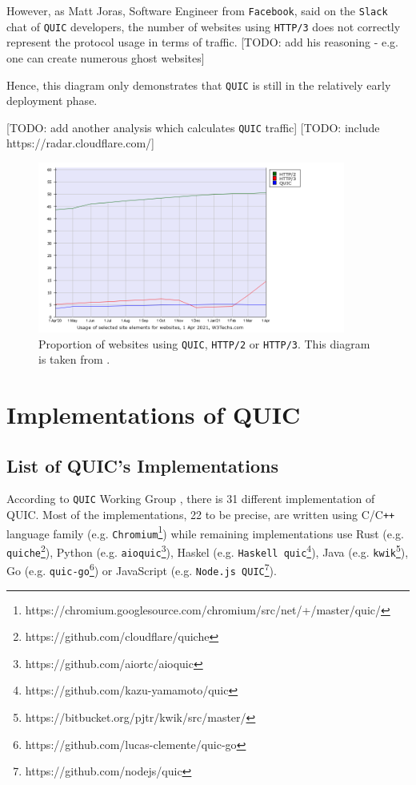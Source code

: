 \documentclass[12pt,a4paper,twoside,openright]{report}
\begin{document}
However, as Matt Joras, Software Engineer from \texttt{Facebook}, said on the \texttt{Slack} chat of \texttt{QUIC} developers, the number of websites using \texttt{HTTP/3} does not correctly represent the protocol usage in terms of traffic. 
[TODO: add his reasoning - e.g. one can create numerous ghost websites]

Hence, this diagram only demonstrates that \texttt{QUIC} is still in the relatively early deployment phase.

[TODO: add another analysis which calculates \texttt{QUIC} traffic]
[TODO: include https://radar.cloudflare.com/]


    \begin{figure}[ht]
    \centering
    \includegraphics[width=0.9\textwidth]{figs/Adoption_comparison_Between_http2_http3_quic.png}
    \caption{Proportion of websites using \texttt{QUIC}, \texttt{HTTP/2} or \texttt{HTTP/3}. This diagram is taken from \cite{bib_Adoption_comparison_Between_http2_http3_quic}.}
    \label{fig:Adoption_comparison_Between_http2_http3_quic}
    \end{figure}









\section{Implementations of QUIC}

\subsection{List of QUIC's Implementations} \label{List_of_QUIC_implementations}
According to \texttt{QUIC} Working Group \cite{number_of_QUIC_implementations}, there is 31 different implementation of QUIC. Most of the implementations, 22 to be precise, are written using C/C\texttt{++} language family (e.g. \texttt{Chromium}\footnote{https://chromium.googlesource.com/chromium/src/net/+/master/quic/}) while remaining implementations use Rust (e.g. \texttt{quiche}\footnote{https://github.com/cloudflare/quiche}), Python (e.g. \texttt{aioquic}\footnote{https://github.com/aiortc/aioquic}), Haskel (e.g. \texttt{Haskell quic}\footnote{https://github.com/kazu-yamamoto/quic}), Java (e.g. \texttt{kwik}\footnote{https://bitbucket.org/pjtr/kwik/src/master/}), Go (e.g. \texttt{quic-go}\footnote{https://github.com/lucas-clemente/quic-go}) or JavaScript (e.g. \texttt{Node.js QUIC}\footnote{https://github.com/nodejs/quic}).
\end{document}
